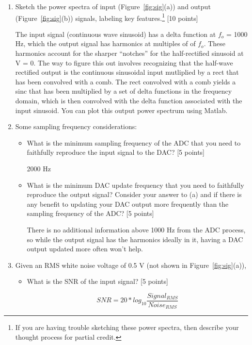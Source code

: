 \begin{enumerate}

\item Sketch the power spectra of input (Figure~\ref{fig:sig}(a)) and output
(Figure~\ref{fig:sig}(b)) signals, labeling key features.\footnote{If you are having
trouble sketching these power spectra, then describe your thought process for
partial credit.} [10 points]

The input signal (continuous wave sinusoid) has a delta function at $f_o$ =
1000 Hz, which the output signal has harmonics at multiples of of $f_o$.  These
harmonics account for the sharper ``notches'' for the half-rectified sinusoid
at V = 0.  The way to figure this out involves recognizing that the half-wave
rectified output is the continuous sinusoidal input mutliplied by a rect that
has been convolved with a comb.  The rect convolved with a comb yields a sinc
that has been multiplied by a set of delta functions in the frequency domain,
which is then convolved with the delta function associated with the input
sinusoid.  You can plot this output power spectrum using Matlab.

\item Some sampling frequency considerations:
\begin{itemize}
    \item What is the minimum sampling frequency of the ADC that you need to
faithfully reproduce the input signal to the DAC?  [5 points]

2000 Hz

    \item What is the minimum DAC update frequency that you need to faithfully
reproduce the output signal?  Consider your answer to (a) and if there is any
benefit to updating your DAC output more frequently than the sampling frequency
of the ADC? [5 points]

There is no additional information above 1000 Hz from the ADC process, so while
the output signal has the harmonics ideally in it, having a DAC output updated
more often won't help.  

\end{itemize}

\item Given an RMS white noise voltage of 0.5 V (not shown in
Figure~\ref{fig:sig}(a)), 
\begin{itemize}
    \item What is the SNR of the input signal? [5 points]

$$ SNR = 20 * log_{10}\frac{Signal_{RMS}}{Noise_{RMS}}$$


\end{itemize}
\end{enumerate}
